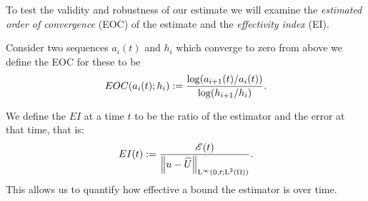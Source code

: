 \documentclass[final]{amsart}
\numberwithin{equation}{section}
\begin{document}
\begin{Defn}
  To test the validity and robustness of our estimate we will
  examine the \emph{estimated order of convergence} (EOC) of the
  estimate and the \emph{effectivity index} (EI).
	
  Consider two sequences $a_i(t)$ and $h_i$ which converge to zero
  from above we define the EOC for these to be
  \begin{equation}\label{eq_EOC}
    EOC\!\left({a_i(t);h_i}\right):=\frac{\log\!\left({a_{i+1}(t)/a_{i}(t)}\right)}{\log\!\left({h_{i+1}/h_{i}}\right)}.
  \end{equation}
	
  We define the $EI$ at a time $t$ to be the ratio of the estimator
  and the error at that time, that is:
  \begin{equation}
    EI\!\left({t}\right):=\frac{\mathscr E(t)}{\left\|u - \widehat U\right\|_{\operatorname L^{\infty}(0,t;\operatorname L^{2}(\Omega))}}.
  \end{equation}
  This allows us to quantify how effective a bound the estimator is
  over time.
\end{Defn}
\end{document}
